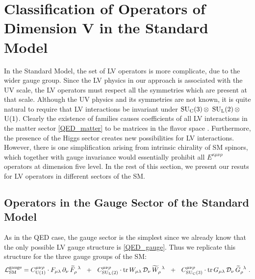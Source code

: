 \documentclass[12pt,preprintnumbers,nofootinbib]{revtex4}
\newcommand{\wt}{\widetilde}
\newcommand{\suc}{{{\rm SU}_{\rm C}(3)}}
\newcommand{\sul}{{{\rm SU}_{\rm L}(2)}}
\newcommand{\ue}{{{\rm U}(1)}}
\begin{document}
\section{Classification of Operators of Dimension V in the Standard Model}

	In the Standard Model, the set of LV operators is more complicate,
	due to the wider gauge group. 
	Since the LV physics in our approach is associated with the UV scale, 
    the LV operators must 
	respect all the symmetries which are present at that scale.
	Although the UV physics and its symmetries are not known, it is quite natural 
    to require that LV interactions be invariant under 
	$ \suc\, \otimes $ $ \sul\, \otimes $ $ \ue $.
	Clearly the existence of families causes coefficients
	of all LV interactions in the matter sector \eqref{QED_matter} to be 
	matrices in the flavor space
\cite{Colladay:1998fq}.
	Furthermore, the presence of the Higgs sector creates new
	possibilities for LV interactions. 
	However, there is one simplification arising from intrinsic chirality of
	SM spinors, which together with gauge invariance 
   would essentially prohibit all $E^{\kappa\mu\nu\rho}$ operators at dimension five level.
In the rest of this section, we present our resuts for LV operators in different 
sectors of the SM. 

	
	
\subsection{Operators in the Gauge Sector of the Standard Model}

	As in the QED case, the gauge sector is the simplest since we already know
	that the only possible LV gauge structure is 
	\eqref{QED_gauge}.
	Thus we replicate this structure for the three gauge groups of the SM:
\begin{equation}
\label{SM_gauge}
	\mathcal{L}_{\rm SM}^{\rm gauge} = 
	C_{\ue}^{\mu\nu\rho} \cdot 
	F_{\mu\lambda} \,\partial_\nu\, \wt{F}_\rho^{\phantom{\rho}\lambda}
	~~+~~
	C_{\sul}^{\mu\nu\rho} \cdot 
	{\rm tr}\,
	W_{\mu\lambda} \,\mathcal{D}_\nu\, \wt{W}_\rho^{\phantom{\rho}\lambda}
	~~+~~
	C_{\suc}^{\mu\nu\rho} \cdot 
	{\rm tr}\,
	G_{\mu\lambda} \,\mathcal{D}_\nu\, \wt{G}_\rho^{\phantom{\rho}\lambda}
	~.
\end{equation}
\end{document}
